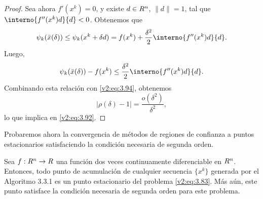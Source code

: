 \begin{proof}
    Sea ahora $f'(x^k) = 0$, y existe $d \in R^n$, $\|d\| = 1$, tal que $\interno{f''(x^k)d}{d} < 0$. Obtenemos que
    \[
        \psi_k(\bar{x}(\delta)) \le \psi_k(x^k + \delta d) = f(x^k) + \frac{\delta^2}{2}\interno{f''(x^k)d}{d}.
    \]
    Luego,
    \[
        \psi_k(\bar{x}(\delta)) - f(x^k) \le \frac{\delta^2}{2}\interno{f''(x^k)d}{d}.
    \]
    Combinando esta relación con \eqref{v2:eq:3.94}, obtenemos
    \[
        |\rho(\delta) - 1| = \frac{o(\delta^2)}{\delta^2},
    \]
    lo que implica en \eqref{v2:eq:3.92}.
\end{proof}

Probaremos ahora la convergencia de métodos de regiones de confianza a puntos estacionarios satisfaciendo la condición necesaria de segunda orden.

\begin{theorem}\label{v2:thm:3.3.2}
    Sea $f : R^n \to R$ una función dos veces continuamente diferenciable en $R^n$.
    Entonces, todo punto de acumulación de cualquier secuencia $\{x^k\}$ generada por el Algoritmo 3.3.1 es un punto estacionario del problema \eqref{v2:eq:3.83}. Más aún, este punto satisface la condición necesaria de segunda orden para este problema.
\end{theorem}

